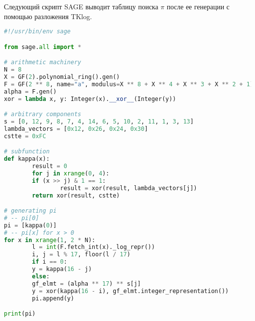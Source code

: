 
Следующий скрипт SAGE \cite{Dev17} выводит таблицу поиска $\pi$ после ее генерации с помощью разложения TKlog.

\begin{lstlisting}[frame=rlbt,language=Python]
#!/usr/bin/env sage

from sage.all import *

# arithmetic machinery
N = 8
X = GF(2).polynomial_ring().gen()
F = GF(2 ** 8, name="a", modulus=X ** 8 + X ** 4 + X ** 3 + X ** 2 + 1)
alpha = F.gen()
xor = lambda x, y: Integer(x).__xor__(Integer(y))

# arbitrary components
s = [0, 12, 9, 8, 7, 4, 14, 6, 5, 10, 2, 11, 1, 3, 13]
lambda_vectors = [0x12, 0x26, 0x24, 0x30]
cstte = 0xFC

# subfunction
def kappa(x):
        result = 0
        for j in xrange(0, 4):
        if (x >> j) & 1 == 1:
                result = xor(result, lambda_vectors[j])
        return xor(result, cstte)

# generating pi
# -- pi[0]
pi = [kappa(0)]
# -- pi[x] for x > 0
for x in xrange(1, 2 * N):
        l = int(F.fetch_int(x)._log_repr())
        i, j = l % 17, floor(l / 17)
        if i == 0:
        y = kappa(16 - j)
        else:
        gf_elmt = (alpha ** 17) ** s[j]
        y = xor(kappa(16 - i), gf_elmt.integer_representation())
        pi.append(y)

print(pi)
\end{lstlisting}